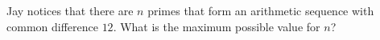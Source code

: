 Jay notices that there are $n$ primes that form an arithmetic sequence with common difference $12$. What is the maximum possible value for $n$?
